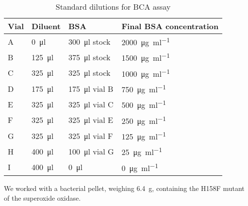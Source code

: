 \begin{table}
	\centering
	\begin{tabu}{llll}
		\toprule Vial & Diluent & BSA & Final BSA concentration \\
		\midrule
		A & \SI{0}{\ul}   & \SI{300}{\ul} stock  & \SI{2000}{\ug\per\ml} \\
		B & \SI{125}{\ul} & \SI{375}{\ul} stock  & \SI{1500}{\ug\per\ml} \\
		C & \SI{325}{\ul} & \SI{325}{\ul} stock  & \SI{1000}{\ug\per\ml} \\
		D & \SI{175}{\ul} & \SI{175}{\ul} vial B & \SI{750}{\ug\per\ml} \\
		E & \SI{325}{\ul} & \SI{325}{\ul} vial C & \SI{500}{\ug\per\ml} \\
		F & \SI{325}{\ul} & \SI{325}{\ul} vial E & \SI{250}{\ug\per\ml} \\
		G & \SI{325}{\ul} & \SI{325}{\ul} vial F & \SI{125}{\ug\per\ml} \\
		H & \SI{400}{\ul} & \SI{100}{\ul} vial G & \SI{25}{\ug\per\ml} \\
		I & \SI{400}{\ul} & \SI{0}{\ul}          & \SI{0}{\ug\per\ml} \\
		\bottomrule
	\end{tabu}
	\caption{Standard dilutions for BCA assay}
	\label{tbl:bca_standard}
\end{table}

We worked with a bacterial pellet, weighing \SI{6.4}{\g}, containing the H158F
mutant of the superoxide oxidase.

